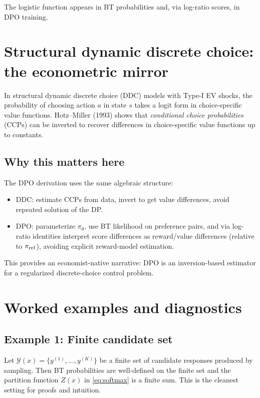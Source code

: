 \noindent The logistic function appears in BT probabilities and, via log-ratio scores, in DPO training.

\section{Structural dynamic discrete choice: the econometric mirror}\label{app:ddc}

In structural dynamic discrete choice (DDC) models with Type-I EV shocks, the probability of choosing action $a$ in state $s$ takes a logit form in choice-specific value functions.
Hotz--Miller (1993) shows that \emph{conditional choice probabilities} (CCPs) can be inverted to recover differences in choice-specific value functions up to constants.

\subsection{Why this matters here}
The DPO derivation uses the same algebraic structure:
\begin{itemize}[leftmargin=1.2cm, itemsep=0.2em]
\item DDC: estimate CCPs from data, invert to get value differences, avoid repeated solution of the DP.
\item DPO: parameterize $\pi_\theta$, use BT likelihood on preference pairs, and via log-ratio identities interpret score differences as reward/value differences (relative to $\pi_{\mathrm{ref}}$), avoiding explicit reward-model estimation.
\end{itemize}

This provides an economist-native narrative: DPO is an inversion-based estimator for a regularized discrete-choice control problem.

\section{Worked examples and diagnostics}\label{app:examples}

\subsection{Example 1: Finite candidate set}
Let $\mathcal{Y}(x)=\{y^{(1)},\dots,y^{(K)}\}$ be a finite set of candidate responses produced by sampling.
Then BT probabilities are well-defined on the finite set and the partition function $Z(x)$ in \eqref{eq:softmax} is a finite sum.
This is the cleanest setting for proofs and intuition.

